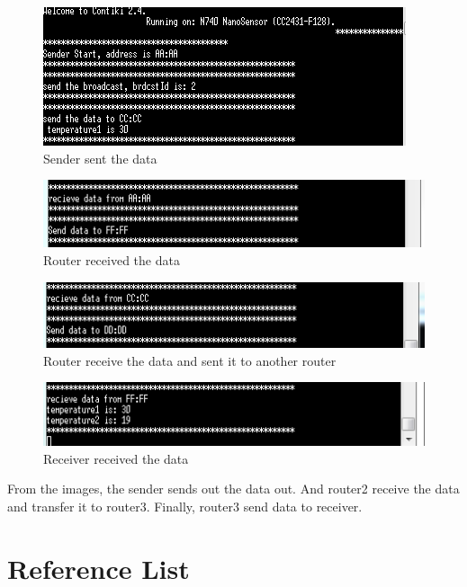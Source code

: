 \documentclass[a4paper]{article}
\begin{document}
\begin{figure}[!htb]
   \centering
   \includegraphics[scale=0.8]{test9}
	\begin{center}
	   \caption{Sender sent the data}
	\end{center}	   
    \label{fig:test9}
\end{figure}

\begin{figure}[!htb]
   \centering
   \includegraphics[scale=0.8]{test10}
	\begin{center}
	   \caption{Router received the data}
	\end{center}	   
    \label{fig:test10}
\end{figure}

\begin{figure}[!htb]
   \centering
   \includegraphics[scale=0.8]{test11}
	\begin{center}
	   \caption{Router receive the data and sent it to another router}
	\end{center}	   
    \label{fig:test11}
\end{figure}

\begin{figure}[!htb]
   \centering
   \includegraphics[scale=0.8]{test12}
	\begin{center}
	   \caption{Receiver received the data}
	\end{center}	   
    \label{fig:test12}
\end{figure}

From the images, the sender sends out the data out. And router2 receive the data and transfer it to router3. Finally, router3 send data to receiver.

\newpage
\section{Reference List}


	
\end{document}
